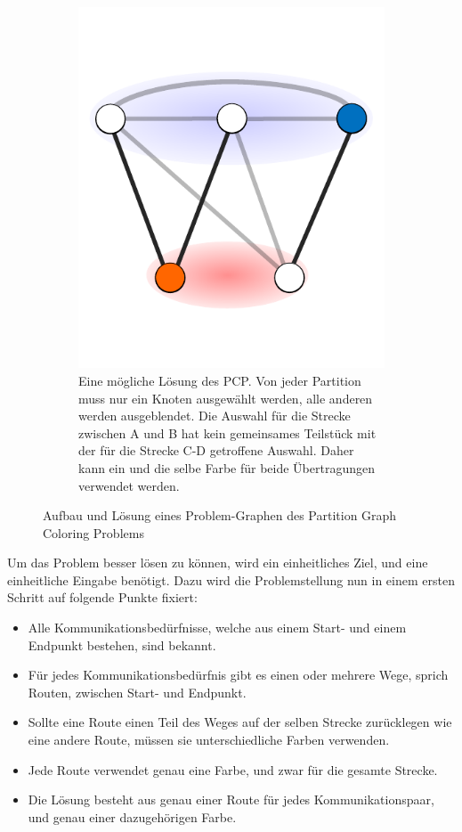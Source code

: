 \begin{figure}
\begin{subfigure}[t]{0.3\textwidth}
		\includegraphics[width=\textwidth]{img/bsp5}
		\caption{Eine mögliche Lösung des PCP. Von jeder Partition muss nur ein Knoten ausgewählt werden, alle anderen werden ausgeblendet. Die Auswahl
		für die Strecke zwischen A und B hat kein gemeinsames Teilstück mit der für die Strecke C-D getroffene Auswahl. Daher kann ein und die selbe Farbe
		für beide Übertragungen verwendet werden.}
		\label{fig:example:e}
	\end{subfigure}
	
	\caption{Aufbau und Lösung eines Problem-Graphen des Partition Graph Coloring Problems}
\end{figure}

Um das Problem besser lösen zu können, wird ein einheitliches Ziel, und eine einheitliche Eingabe benötigt.
Dazu wird die Problemstellung nun in einem ersten Schritt auf folgende Punkte fixiert:
\begin{itemize}
	\item Alle Kommunikationsbedürfnisse, welche aus einem Start- und einem Endpunkt bestehen, sind bekannt.
	\item Für jedes Kommunikationsbedürfnis gibt es einen oder mehrere Wege, sprich Routen, zwischen Start- und Endpunkt.
	\item Sollte eine Route einen Teil des Weges auf der selben Strecke zurücklegen wie eine andere Route, müssen sie unterschiedliche Farben verwenden.
	\item Jede Route verwendet genau eine Farbe, und zwar für die gesamte Strecke.
	\item Die Lösung besteht aus genau einer Route für jedes Kommunikationspaar, und genau einer dazugehörigen Farbe.
\end{itemize}

